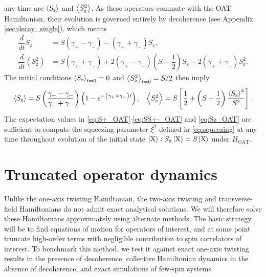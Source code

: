 \documentclass[aps,notitlepage,nofootinbib,11pt]{revtex4-1}
\renewcommand{\t}{\text} %
\newcommand{\f}[2]{\dfrac{#1}{#2}} %
\newcommand{\p}[1]{\left(#1\right)} %
\renewcommand{\sp}[1]{\left[#1\right]} %
\newcommand{\bk}{\Braket} %
\newcommand{\z}{\text{z}}
\newcommand{\x}{\text{x}}
\newcommand{\X}{\text{X}}
\newcommand{\1}{\mathds{1}}
\begin{document}
any time are $\bk{S_\z}$ and $\bk{S_\z^2}$.  As these operators
commute with the OAT Hamiltonian, their evolution is governed entirely
by decoherence (see Appendix \ref{sec:decay_single}), which means
\begin{align}
  \f{d}{dt} S_\z
  &= S\p{\gamma_+-\gamma_-} - \p{\gamma_++\gamma_-} S_\z,
  \\
  \f{d}{dt}\p{S_\z^2}
  &= S\p{\gamma_++\gamma_-} + 2\p{\gamma_+-\gamma_-}\p{S-\f12} S_\z
  - 2 \p{\gamma_++\gamma_-} S_\z^2.
\end{align}
The initial conditions $\bk{S_\z}_{t=0}=0$ and $\bk{S_\z^2}_{t=0}=S/2$
then imply
\begin{align}
  \bk{S_\z}
  = S\p{\f{\gamma_+-\gamma_-}{\gamma_++\gamma_-}}
  \p{1-e^{-\p{\gamma_+ + \gamma_-} t}},
  &&
  \bk{S_\z^2} = S \sp{\f12 + \p{S-\f12} \f{\bk{S_\z}^2}{S^2}}.
  \label{eq:Sz_OAT}
\end{align}
The expectation values in \eqref{eq:S+_OAT}-\eqref{eq:SS+-_OAT} and
\eqref{eq:Sz_OAT} are sufficient to compute the squeezing parameter
$\xi^2$ defined in \eqref{eq:squeezing} at any time throughout
evolution of the initial state $\ket{\X}:S_\x\ket{\X}=S\ket{\X}$ under
$H_{\t{OAT}}$.


\section{Truncated operator dynamics}

Unlike the one-axis twisting Hamiltonian, the two-axis twisting and
transverse-field Hamiltonians do not admit exact analytical
solutions. We will therefore solve these Hamiltonians approximately
using alternate methods.  The basic strategy will be to find equations
of motion for operators of interest, and at some point truncate
high-order terms with negligible contribution to spin correlators of
interest.  To benchmark this method, we test it against exact one-axis
twisting results in the presence of decoherence, collective
Hamiltonian dynamics in the absence of decoherence, and exact
simulations of few-spin systems.
\end{document}
